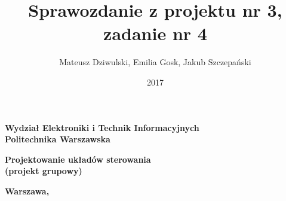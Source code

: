 \documentclass[a4paper,titlepage,11pt,twosides,floatssmall]{mwrep}
\begin{document}
\frenchspacing
\pagestyle{uheadings}

\title{\bf Sprawozdanie z projektu nr 3, zadanie nr 4\vskip 0.1cm}
\author{Mateusz Dziwulski, Emilia Gosk, Jakub Szczepański}
\date{2017}

\makeatletter
\renewcommand{\maketitle}{\begin{titlepage}
\begin{center}{\LARGE {\bf
Wydział Elektroniki i Technik Informacyjnych}}\\
\vspace{0.4cm}
{\LARGE {\bf Politechnika Warszawska}}\\
\vspace{0.3cm}
\end{center}
\vspace{5cm}
\begin{center}
{\bf \LARGE Projektowanie układów sterowania\\ (projekt grupowy) \vskip 0.1cm}
\end{center}
\vspace{1cm}
\begin{center}
{\bf \LARGE \@title}
\end{center}
\vspace{2cm}
\begin{center}
{\bf \Large \@author \par}
\end{center}
\vspace*{\stretch{6}}
\begin{center}
\bf{\large{Warszawa, \@date\vskip 0.1cm}}
\end{center}
\end{titlepage}
}
\makeatother

\maketitle

\tableofcontents

\end{document}
